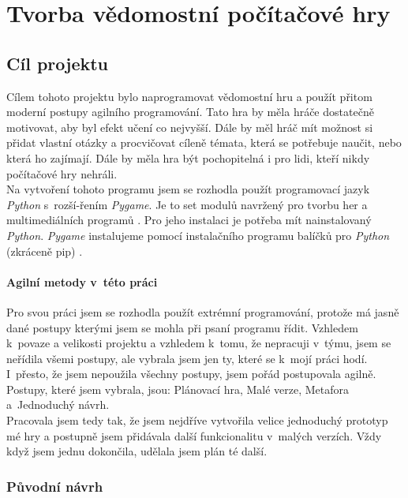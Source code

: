 \documentclass[12pt]{report}
\begin{document}

\part{Tvorba vědomostní počítačové hry} %

\chapter{Cíl projektu}

Cílem tohoto projektu bylo naprogramovat vědomostní hru a použít přitom moderní postupy agilního programování. Tato hra by měla hráče dostatečně motivovat, aby byl efekt učení co nejvyšší. Dále by měl hráč mít možnost si přidat vlastní otázky a procvičovat cíleně témata, která se potřebuje naučit, nebo která ho zajímají. Dále by měla hra být pochopitelná i pro lidi, kteří nikdy počítačové hry nehráli.\\

 Na vytvoření tohoto programu jsem se rozhodla použít programovací jazyk \textit{Python} s~rozší-řením \textit{Pygame}. Je to set modulů navržený pro tvorbu her a multimediálních programů \cite{Pygame2026a}. Pro jeho instalaci je potřeba mít nainstalovaný \textit{Python}. \textit{Pygame} instalujeme pomocí instalačního programu balíčků pro \textit{Python} (zkráceně pip) \cite{Pygame2026}.
	
		\subsection{Agilní metody v~této práci}
		
		Pro svou práci jsem se rozhodla použít extrémní programování, protože má jasně dané postupy kterými jsem se mohla při psaní programu řídit. Vzhledem k~povaze a velikosti projektu a vzhledem k~tomu, že nepracuji v~týmu, jsem se neřídila všemi postupy, ale vybrala jsem jen ty, které se k~mojí práci hodí. I~přesto, že jsem nepoužila všechny postupy, jsem pořád postupovala agilně. Postupy, které jsem vybrala, jsou: Plánovací hra, Malé verze, Metafora a~Jednoduchý návrh.\\
		
		Pracovala jsem tedy tak, že jsem nejdříve vytvořila velice jednoduchý prototyp mé hry a postupně jsem přidávala další funkcionalitu v~malých verzích. Vždy když jsem jednu dokončila, udělala jsem plán té další. 
		
	\section{Původní návrh}
\end{document}
